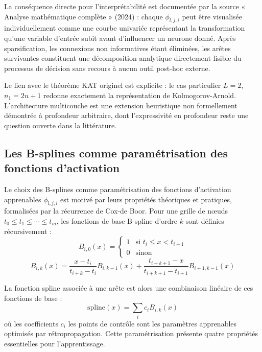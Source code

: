 \documentclass[11pt,a4paper,oneside]{report}
\theoremstyle{definition}
\theoremstyle{remark}
\begin{document}
La conséquence directe pour l'interprétabilité est documentée par la source « Analyse mathématique complète » (2024) : chaque $\phi_{l,j,i}$ peut être visualisée individuellement comme une courbe univariée représentant la transformation qu'une variable d'entrée subit avant d'influencer un neurone donné. Après sparsification, les connexions non informatives étant éliminées, les arêtes survivantes constituent une décomposition analytique directement lisible du processus de décision  sans recours à aucun outil post-hoc externe.

Le lien avec le théorème KAT originel est explicite : le cas particulier $L=2$, $n_1 = 2n+1$ redonne exactement la représentation de Kolmogorov-Arnold. L'architecture multicouche est une extension heuristique  non formellement démontrée  à profondeur arbitraire, dont l'expressivité en profondeur reste une question ouverte dans la littérature.

\subsection{Les B-splines comme paramétrisation des fonctions d'activation}

Le choix des B-splines comme paramétrisation des fonctions d'activation apprenables $\phi_{l,j,i}$ est motivé par leurs propriétés théoriques et pratiques, formalisées par la récurrence de Cox-de Boor. Pour une grille de nœuds $t_0 \leq t_1 \leq \cdots \leq t_m$, les fonctions de base B-spline d'ordre $k$ sont définies récursivement :
\begin{equation}
B_{i,0}(x) = \begin{cases} 1 & \text{si } t_i \leq x < t_{i+1} \\ 0 & \text{sinon} \end{cases}
\end{equation}
\begin{equation}
B_{i,k}(x) = \frac{x - t_i}{t_{i+k} - t_i} B_{i,k-1}(x) + \frac{t_{i+k+1} - x}{t_{i+k+1} - t_{i+1}} B_{i+1,k-1}(x)
\end{equation}

La fonction spline associée à une arête est alors une combinaison linéaire de ces fonctions de base :
\begin{equation}
\text{spline}(x) = \sum_i c_i B_{i,k}(x)
\end{equation}
où les coefficients $c_i$  les points de contrôle  sont les paramètres apprenables optimisés par rétropropagation. Cette paramétrisation présente quatre propriétés essentielles pour l'apprentissage.
\end{document}
